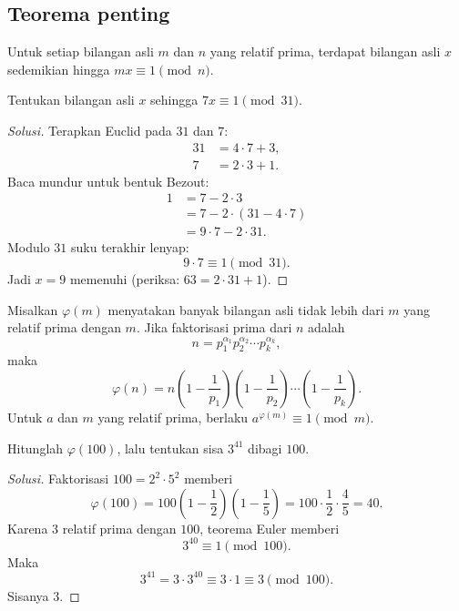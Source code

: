\documentclass[12pt]{scrartcl}
\begin{document}
\subsection{Teorema penting}

\begin{theorem}
Untuk setiap bilangan asli $m$ dan $n$ yang relatif prima,
terdapat bilangan asli $x$ sedemikian hingga $mx \equiv 1 \pmod{n}$.
\end{theorem}

\begin{example}
Tentukan bilangan asli $x$ sehingga $7x \equiv 1 \pmod{31}$.
\end{example}
\begin{proof}[Solusi]
Terapkan Euclid pada $31$ dan $7$:
\begin{align*}
31 &= 4 \cdot 7 + 3, \\
7 &= 2 \cdot 3 + 1.
\end{align*}
Baca mundur untuk bentuk Bezout:
\begin{align*}
1 &= 7 - 2 \cdot 3 \\
&= 7 - 2 \cdot (31 - 4 \cdot 7) \\
&= 9 \cdot 7 - 2 \cdot 31.
\end{align*}
Modulo $31$ suku terakhir lenyap:
\[ 9 \cdot 7 \equiv 1 \pmod{31}. \]
Jadi $x = 9$ memenuhi (periksa: $63 = 2 \cdot 31 + 1$).
\end{proof}

\begin{theorem}[Euler]
Misalkan $\varphi(m)$ menyatakan banyak bilangan asli tidak lebih dari $m$
yang relatif prima dengan $m$. Jika faktorisasi prima dari $n$ adalah
\[ n = p_1^{\alpha_1} p_2^{\alpha_2} \cdots p_k^{\alpha_k}, \]
maka
\[ \varphi(n) = n\left(1 - \frac{1}{p_1}\right)\left(1 - \frac{1}{p_2}\right)
\cdots\left(1 - \frac{1}{p_k}\right). \]
Untuk $a$ dan $m$ yang relatif prima, berlaku $a^{\varphi(m)} \equiv 1 \pmod{m}$.
\end{theorem}

\begin{example}
Hitunglah $\varphi(100)$, lalu tentukan sisa $3^{41}$ dibagi $100$.
\end{example}
\begin{proof}[Solusi]
Faktorisasi $100 = 2^2 \cdot 5^2$ memberi
\[ \varphi(100) = 100\left(1 - \frac{1}{2}\right)\left(1 - \frac{1}{5}\right) = 100 \cdot \frac{1}{2} \cdot \frac{4}{5} = 40. \]
Karena $3$ relatif prima dengan $100$, teorema Euler memberi
\[ 3^{40} \equiv 1 \pmod{100}. \]
Maka
\[ 3^{41} = 3 \cdot 3^{40} \equiv 3 \cdot 1 \equiv 3 \pmod{100}. \]
Sisanya $3$.
\end{proof}
\end{document}
